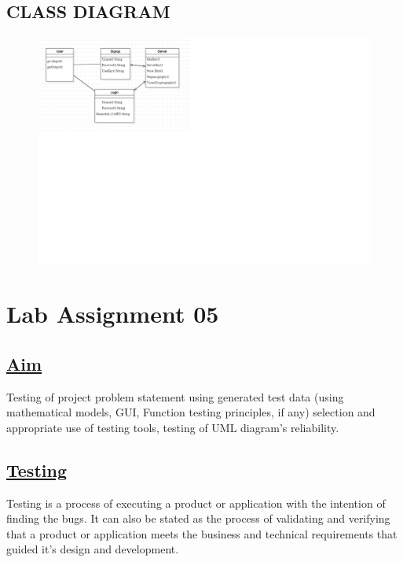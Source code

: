     \subsection*{CLASS DIAGRAM}
    \begin{figure}[H]
    \centering
  \includegraphics[scale=0.9]{Class.png}
\end{figure}


\newpage
\section*{\centering\LARGE{Lab Assignment 05}}
\subsection*{\underline{Aim}}
Testing of project problem statement using generated test data (using mathematical models, GUI, Function testing principles, if any) selection and appropriate use of testing tools, testing of UML diagram's reliability.
\noindent
\subsection*{\underline{Testing}}
\hspace{5em}Testing is a process of executing a product or application with the intention  of finding the  bugs. It can also be stated as the process of validating and verifying that a product or application meets the business and technical requirements that guided it's design and development.\\

